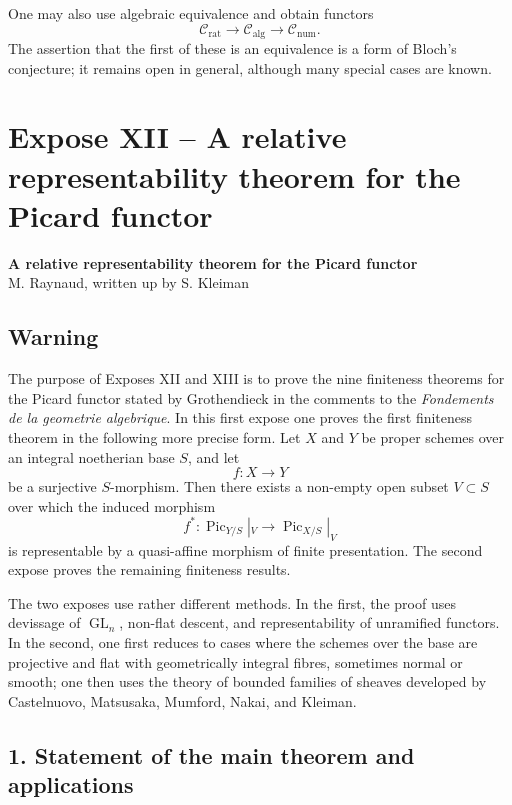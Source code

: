 \documentclass[11pt]{article}
\theoremstyle{plain}
\theoremstyle{definition}
\theoremstyle{remark}
\DeclareMathOperator{\Pic}{Pic}
\newcommand{\longto}{\longrightarrow}
\providecommand{\Gl}{\operatorname{GL}}
\begin{document}
One may also use algebraic equivalence and obtain functors
\[
\mathcal C_{\mathrm{rat}}\longto\mathcal C_{\mathrm{alg}}\longto\mathcal C_{\mathrm{num}}.
\]
The assertion that the first of these is an equivalence is a form of Bloch's conjecture; it remains open in general, although many special cases are known.

\section*{Expose XII -- A relative representability theorem for the Picard functor}

\begin{center}
{\large\textbf{A relative representability theorem for the Picard functor}}\\[0.25em]
{\normalsize M. Raynaud, written up by S. Kleiman}
\end{center}

\subsection*{Warning}

The purpose of Exposes XII and XIII is to prove the nine finiteness theorems for the Picard functor stated by Grothendieck in the comments to the \emph{Fondements de la geometrie algebrique}. In this first expose one proves the first finiteness theorem in the following more precise form. Let $X$ and $Y$ be proper schemes over an integral noetherian base $S$, and let
\[
f:X\to Y
\]
be a surjective $S$-morphism. Then there exists a non-empty open subset $V\subset S$ over which the induced morphism
\[
f^*:\Pic_{Y/S}|_V\longto\Pic_{X/S}|_V
\]
is representable by a quasi-affine morphism of finite presentation. The second expose proves the remaining finiteness results.

The two exposes use rather different methods. In the first, the proof uses devissage of $\Gl_n$, non-flat descent, and representability of unramified functors. In the second, one first reduces to cases where the schemes over the base are projective and flat with geometrically integral fibres, sometimes normal or smooth; one then uses the theory of bounded families of sheaves developed by Castelnuovo, Matsusaka, Mumford, Nakai, and Kleiman.

\subsection*{1. Statement of the main theorem and applications}
\end{document}
